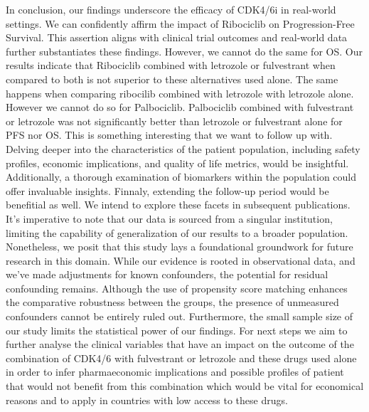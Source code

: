 In conclusion, our findings underscore the efficacy of CDK4/6i in real-world settings. We can confidently affirm the impact of Ribociclib on Progression-Free Survival. This assertion aligns with clinical trial outcomes and real-world data further substantiates these findings. However, we cannot do the same for OS. Our results indicate that Ribociclib combined with letrozole or fulvestrant when compared to both is not superior to these alternatives used alone. The same happens when comparing ribocilib combined with letrozole with letrozole alone. 
However we cannot do so for Palbociclib. Palbociclib combined with fulvestrant or letrozole was not significantly better than letrozole or fulvestrant alone for PFS nor OS. This is something interesting that we want to follow up with.
Delving deeper into the characteristics of the patient population, including safety profiles, economic implications, and quality of life metrics, would be insightful. Additionally, a thorough examination of biomarkers within the population could offer invaluable insights. Finnaly, extending the follow-up period would be benefitial as well. We intend to explore these facets in subsequent publications.
It’s imperative to note that our data is sourced from a singular institution, limiting the capability of generalization of our results to a broader population. Nonetheless, we posit that this study lays a foundational groundwork for future research in this domain. While our evidence is rooted in observational data, and we’ve made adjustments for known confounders, the potential for residual confounding remains. Although the use of propensity score matching enhances the comparative robustness between the groups, the presence of unmeasured confounders cannot be entirely ruled out. Furthermore, the small sample size of our study limits the statistical power of our findings. For next steps we aim to further analyse the clinical variables that have an impact on the outcome of the combination of CDK4/6 with fulvestrant or letrozole and these drugs used alone in order to infer pharmaeconomic implications and possible profiles of patient that would not benefit from this combination which would be vital for economical reasons and to apply in countries with low access to these drugs.